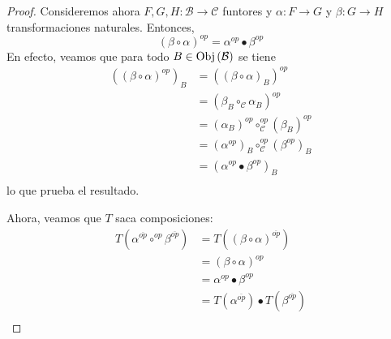 \documentclass[12pt]{report}
\newcounter{it}
\theoremstyle{largebreak}
\newcommand\cf[3]{\ensuremath{#1:#2\rightarrow#3}}
\newcommand{\Obj}[1]{\ensuremath{\textup{Obj}\left(#1\right)}}
\begin{document}
\begin{proof}
        Consideremos ahora $\cf{F,G,H}{\mathcal{B}}{\mathcal{C}}$ funtores y $\cf{\alpha}{F}{G}$ y $\cf{\beta}{G}{H}$ transformaciones naturales. Entonces,
        \begin{equation*}
            (\beta\circ\alpha)^{op}=\alpha^{op}\bullet\beta^{op}
        \end{equation*}
        En efecto, veamos que para todo $B\in\Obj{\mathcal{B}}$ se tiene
        \begin{equation*}
            \begin{split}
                \left((\beta\circ\alpha)^{op}\right)_B&=((\beta\circ\alpha)_B)^{op}\\
                &=(\beta_B\circ_{\mathcal{C}}\alpha_B)^{op}\\
                &=(\alpha_B)^{op}\circ_{\mathcal{C}}^{op}(\beta_B)^{op}\\
                &=(\alpha^{op})_B\circ_{\mathcal{C}}^{op}(\beta^{op})_B\\
                &=(\alpha^{op}\bullet\beta^{op})_B\\
            \end{split}
        \end{equation*}
        lo que prueba el resultado.

        Ahora, veamos que $T$ saca composiciones:
        \begin{equation*}
            \begin{split}
                T(\alpha^{\overline{op}}\circ^{op}\beta^{\overline{op}})&=T((\beta\circ\alpha)^{\overline{op}})\\
                &=(\beta\circ\alpha)^{op}\\
                &=\alpha^{op}\bullet\beta^{op}\\
                &=T(\alpha^{\overline{op}})\bullet T(\beta^{\overline{op}})\\
            \end{split}
        \end{equation*}


\end{proof}
\end{document}
